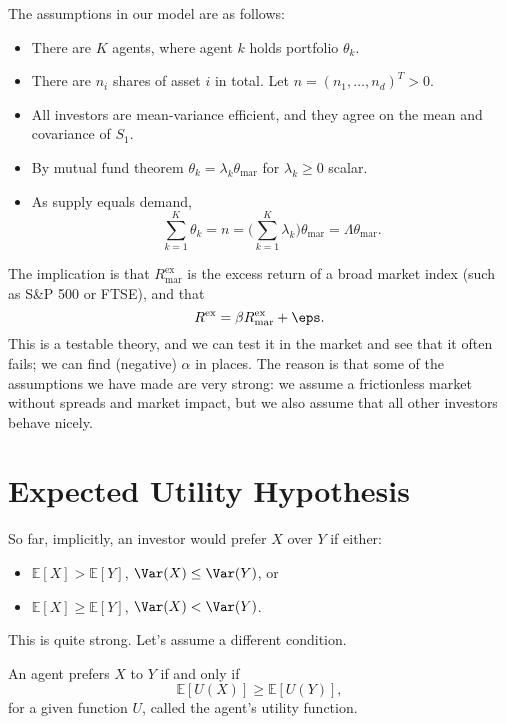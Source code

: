 \documentclass[12pt]{article}
\begin{document}
The assumptions in our model are as follows:
\begin{itemize}
	\item There are $K$ agents, where agent $k$ holds portfolio $\theta_k$.
	\item There are $n_i$ shares of asset $i$ in total. Let $n = (n_1, \ldots, n_d)^{T} > 0$.
	\item All investors are mean-variance efficient, and they agree on the mean and covariance of $S_1$.
	\item By mutual fund theorem $\theta_k = \lambda_k \theta_{\mathrm{mar}}$ for $\lambda_k \geq 0$ scalar.
	\item As supply equals demand,
		\[
		\sum_{k = 1}^{K}\theta_k = n = \Biggl( \sum_{k = 1}^{K} \lambda_k \Biggr) \theta_{\mathrm{mar}} = \Lambda \theta_{\mathrm{mar}}.
		\]
\end{itemize}

The implication is that $R^{\mathrm{ex}}_{\mathrm{mar}}$ is the excess return of a broad market index (such as S\&P 500 or FTSE), and that
\[
R^{\mathrm{ex}} = \beta R^{\mathrm{ex}}_{\mathrm{mar}} + \eps.
\]
This is a testable theory, and we can test it in the market and see that it often fails; we can find (negative) $\alpha$ in places. The reason is that some of the assumptions we have made are very strong: we assume a frictionless market without spreads and market impact, but we also assume that all other investors behave nicely.

\newpage

\section{Expected Utility Hypothesis}
\label{sec:utility}

So far, implicitly, an investor would prefer $X$ over $Y$ if either:
\begin{itemize}
	\item $\mathbb{E}[X] > \mathbb{E}[Y]$, $\Var(X) \leq \Var(Y)$, or
	\item $\mathbb{E}[X] \geq \mathbb{E}[Y]$, $\Var(X) < \Var(Y)$.
\end{itemize}

This is quite strong. Let's assume a different condition.

\begin{proposition}
	An agent prefers $X$ to $Y$ if and only if
	 \[
	\mathbb{E}[U(X)] \geq \mathbb{E}[U(Y)],
	\]
	for a given function $U$, called the agent's utility function.
\end{proposition}
\end{document}
